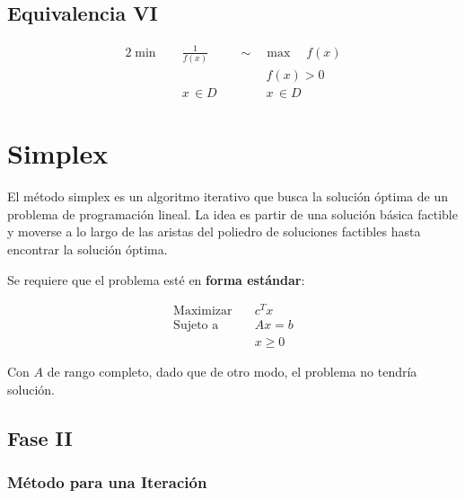 \documentclass{article}
\begin{document}
\subsection{Equivalencia VI}

\begin{alignat*}{2}
    \min \quad & \frac{1}{f(x)} \quad && \sim \quad \max \quad f(x) \\
    & && \qquad f(x) > 0 \\
    & x\,\in D && \qquad x\,\in D
\end{alignat*}

\section{Simplex}

El método simplex es un algoritmo iterativo que busca la solución óptima de un problema de programación lineal. La idea es partir de una solución básica factible y moverse a lo largo de las aristas del poliedro de soluciones factibles hasta encontrar la solución óptima.

Se requiere que el problema esté en \textbf{forma estándar}:

\begin{align*}
    \text{Maximizar} \quad & c^T x \\
    \text{Sujeto a} \quad & Ax = b \\
    & x \geq 0
\end{align*}

Con $A$ de rango completo, dado que de otro modo, el problema no tendría solución.


\subsection{Fase II}

\subsubsection{Método para una Iteración}
\end{document}
